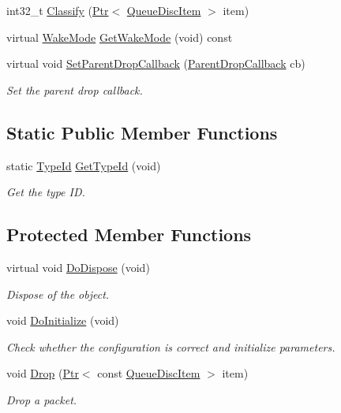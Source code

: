 \begin{DoxyCompactItemize}
int32\+\_\+t \hyperlink{classns3_1_1QueueDisc_a560004f3fbca4e2cb9938fa3938f4be3}{Classify} (\hyperlink{classns3_1_1Ptr}{Ptr}$<$ \hyperlink{classns3_1_1QueueDiscItem}{Queue\+Disc\+Item} $>$ item)
\item 
virtual \hyperlink{classns3_1_1QueueDisc_a0b9b32e71d5becf66e6ac4b3d3de7c8b}{Wake\+Mode} \hyperlink{classns3_1_1QueueDisc_a51a079153b474eec1bad9abe715d9510}{Get\+Wake\+Mode} (void) const 
\item 
virtual void \hyperlink{classns3_1_1QueueDisc_ac0a9b81f70b0ef63d3bd31718691e6e9}{Set\+Parent\+Drop\+Callback} (\hyperlink{classns3_1_1QueueDisc_abcb41646ec54f8206bc14df2c93762f4}{Parent\+Drop\+Callback} cb)
\begin{DoxyCompactList}\small\item\em Set the parent drop callback. \end{DoxyCompactList}\end{DoxyCompactItemize}
\subsection*{Static Public Member Functions}
\begin{DoxyCompactItemize}
\item 
static \hyperlink{classns3_1_1TypeId}{Type\+Id} \hyperlink{classns3_1_1QueueDisc_a425dcb905ce9b18fa5e83316fc63961e}{Get\+Type\+Id} (void)
\begin{DoxyCompactList}\small\item\em Get the type ID. \end{DoxyCompactList}\end{DoxyCompactItemize}
\subsection*{Protected Member Functions}
\begin{DoxyCompactItemize}
\item 
virtual void \hyperlink{classns3_1_1QueueDisc_ad2eafba04edabab10bc6ea9d5ea273e1}{Do\+Dispose} (void)
\begin{DoxyCompactList}\small\item\em Dispose of the object. \end{DoxyCompactList}\item 
void \hyperlink{classns3_1_1QueueDisc_a7b75249652866a0725c6f280bd618123}{Do\+Initialize} (void)
\begin{DoxyCompactList}\small\item\em Check whether the configuration is correct and initialize parameters. \end{DoxyCompactList}\item 
void \hyperlink{classns3_1_1QueueDisc_a4e8bbd3afbd927df3342dd015f30b08c}{Drop} (\hyperlink{classns3_1_1Ptr}{Ptr}$<$ const \hyperlink{classns3_1_1QueueDiscItem}{Queue\+Disc\+Item} $>$ item)
\begin{DoxyCompactList}\small\item\em Drop a packet. \end{DoxyCompactList}\end{DoxyCompactItemize}
